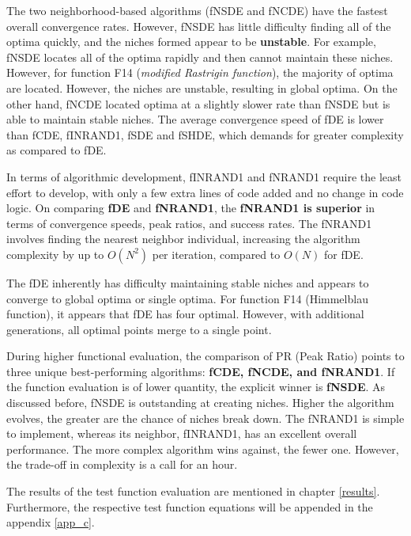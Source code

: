 The two neighborhood-based
algorithms (fNSDE and fNCDE) have the fastest overall convergence rates. However, fNSDE
has little difficulty finding all of the optima quickly, and the niches formed appear to be \textbf{unstable}. For example, fNSDE locates all of the optima rapidly and then cannot maintain these niches. However, for function F14 (\textit{modified Rastrigin function}), the majority of optima are located. However, the niches are unstable, resulting in global optima. On the other hand, fNCDE located optima at a slightly slower rate than fNSDE but is able to maintain stable niches. The average convergence speed of fDE is lower than fCDE, fINRAND1, fSDE and fSHDE, which demands for greater complexity as compared to fDE.

In terms of algorithmic development, fINRAND1 and fNRAND1 require the least effort to develop, with only a few extra lines of code added and no change in code logic. On comparing \textbf{fDE} and \textbf{fNRAND1}, the \textbf{fNRAND1 is superior} in terms of convergence speeds, peak ratios, and success rates. The fNRAND1 involves finding the nearest neighbor individual, increasing the algorithm complexity by up to $O(N^2)$ per iteration, compared to $O(N)$ for fDE.

The fDE inherently has difficulty maintaining stable niches and appears to converge to global optima or single optima. For function F14 (Himmelblau function), it appears that fDE has four optimal. However, with additional generations, all optimal points merge to a single point.

During higher functional evaluation, the comparison of PR (Peak Ratio) \cite{Poole3} points to three unique best-performing algorithms: \textbf{fCDE, fNCDE, and fNRAND1}. If the function evaluation is of lower quantity, the explicit winner is \textbf{fNSDE}. As discussed before, fNSDE is outstanding at creating niches. Higher the algorithm evolves, the greater are the chance of niches break down. The fNRAND1 is simple to implement, whereas its neighbor, fINRAND1, has an excellent overall performance. The more complex algorithm wins against, the fewer one. However, the trade-off in complexity is a call for an hour.

The results of the test function evaluation are mentioned in chapter \ref{results}. Furthermore, the respective test function equations will be appended in the appendix \ref{app_c}.